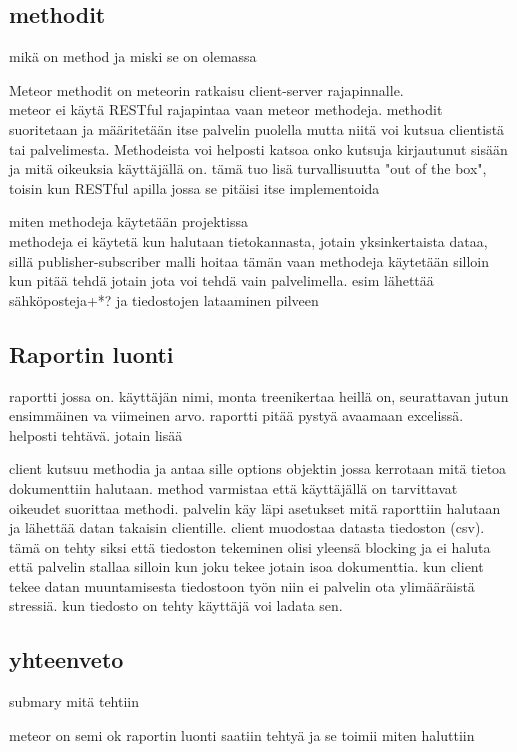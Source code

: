 \subsection*{methodit}
mikä on method ja miski se on olemassa

Meteor methodit on meteorin ratkaisu client-server rajapinnalle. \\
%
meteor ei käytä RESTful rajapintaa vaan meteor methodeja.
methodit suoritetaan ja määritetään itse palvelin puolella mutta niitä voi kutsua clientistä tai palvelimesta.
Methodeista voi helposti katsoa onko kutsuja kirjautunut sisään ja mitä oikeuksia käyttäjällä on. tämä tuo lisä turvallisuutta "out of the box", toisin kun RESTful apilla jossa se pitäisi itse implementoida
\medskip

miten methodeja käytetään projektissa\\
methodeja ei käytetä kun halutaan tietokannasta, jotain yksinkertaista dataa, sillä publisher-subscriber malli hoitaa tämän
vaan methodeja käytetään silloin kun pitää tehdä jotain jota voi tehdä vain palvelimella. esim lähettää sähköposteja+*? ja tiedostojen lataaminen pilveen 
\medskip



\subsection*{Raportin luonti}

raportti jossa on. käyttäjän nimi, monta treenikertaa heillä on, seurattavan jutun ensimmäinen va viimeinen arvo.
raportti pitää pystyä avaamaan excelissä.
helposti tehtävä. jotain lisää
\medskip


client kutsuu methodia ja antaa sille options objektin jossa kerrotaan mitä tietoa dokumenttiin halutaan. method varmistaa että käyttäjällä on tarvittavat oikeudet suorittaa methodi.
palvelin käy läpi asetukset mitä raporttiin halutaan ja lähettää datan takaisin clientille.
client muodostaa datasta tiedoston (csv). tämä on tehty siksi että tiedoston tekeminen olisi yleensä blocking ja ei haluta että palvelin stallaa silloin kun joku tekee jotain isoa dokumenttia.
kun client tekee datan muuntamisesta tiedostoon työn niin ei palvelin ota ylimääräistä stressiä.
kun tiedosto on tehty käyttäjä voi ladata sen.
\medskip


\subsection*{yhteenveto}
submary mitä tehtiin

meteor on semi ok
raportin luonti saatiin tehtyä ja se toimii miten haluttiin

